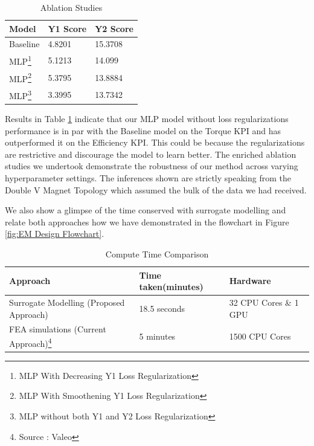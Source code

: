 \documentclass{report} %
\begin{document}
\begin{minipage}[t]{\textwidth}
    \begin{table}[H]
        \centering
        \begin{tabular}{|p{}|p{}|p{}|}
        \hline {\bf Model} & {\bf Y1 Score} & {\bf Y2 Score}\\
        \hline 
        Baseline & 4.8201 & 15.3708 \\
        MLP\footnote{MLP With Decreasing Y1 Loss Regularization} & 5.1213 & 14.099 \\
        MLP\footnote{MLP With Smoothening Y1 Loss Regularization} & 5.3795 & 13.8884 \\
        MLP\footnote{MLP without both Y1 and Y2 Loss Regularization} & 3.3995 & 13.7342  \\
        \hline
        \end{tabular}
        \caption{Ablation Studies}
        \label{tab:Ablation Studies}
    \end{table}
\end{minipage}

\vspace{1em} %

Results in Table \ref{tab:Ablation Studies} indicate that our \ac{MLP} model without loss regularizations performance is in par with the Baseline model on the Torque 
\ac{KPI} and has outperformed it on the Efficiency \ac{KPI}. This could be because the regularizations are restrictive and discourage the model to learn better.
The enriched ablation studies we undertook demonstrate the robustness of our method across varying hyperparameter settings.
The inferences shown are strictly speaking from the Double V Magnet Topology which assumed the bulk of the data we had received.

We also show a glimpse of the time conserved with surrogate modelling and relate both approaches how we have demonstrated in the flowchart in Figure 
\ref{fig:EM Design Flowchart}.

\begin{minipage}[t]{\textwidth}
    \begin{table}[H]
        \centering
        \begin{tabular}{|p{}|p{}|p{}|}
        \hline {\bf Approach} & {\bf Time taken(minutes)} & {\bf Hardware}\\
        \hline 
        Surrogate Modelling (Proposed Approach) & 18.5 seconds & 32 CPU Cores \& 1 GPU\\
        \ac{FEA} simulations (Current Approach)\footnote{Source : Valeo} & 5 minutes & 1500 CPU Cores\\
        \hline
        \end{tabular}
        \caption{Compute Time Comparison}
        \label{tab:Compute Time Comparisions}
    \end{table}
\end{minipage}
\end{document}
